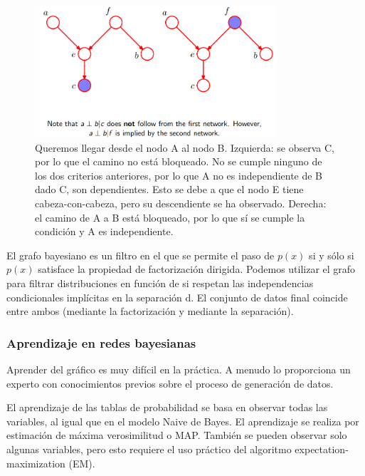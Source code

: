 \begin{figure}[h]
\centering
\includegraphics[width = 0.8\textwidth]{figs/conditional-independence.png}
\caption{Queremos llegar desde el nodo A al nodo B. Izquierda: se observa C, por lo que el camino no está bloqueado. No se cumple ninguno de los dos criterios anteriores, por lo que A no es independiente de B dado C, son dependientes. Esto se debe a que el nodo E tiene cabeza-con-cabeza, pero su descendiente se ha observado. Derecha: el camino de A a B está bloqueado, por lo que sí se cumple la condición y A es independiente.}
\end{figure}

El grafo bayesiano es un filtro en el que se permite el paso de $p(x)$ si y sólo si $p(x)$ satisface la propiedad de factorización dirigida. Podemos utilizar el grafo para filtrar distribuciones en función de si respetan las independencias condicionales implícitas en la separación d. El conjunto de datos final coincide entre ambos (mediante la factorización y mediante la separación).

\subsubsection{Aprendizaje en redes bayesianas}
Aprender del gráfico es muy difícil en la práctica. A menudo lo proporciona un experto con conocimientos previos sobre el proceso de generación de datos.

El aprendizaje de las tablas de probabilidad se basa en observar todas las variables, al igual que en el modelo Naive de Bayes. El aprendizaje se realiza por estimación de máxima verosimilitud o MAP. También se pueden observar solo algunas variables, pero esto requiere el uso práctico del algoritmo expectation-maximization (EM).

